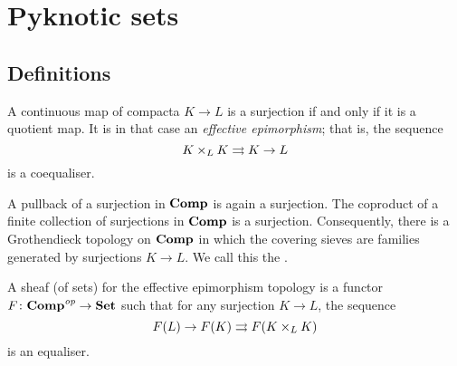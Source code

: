 
\section{Pyknotic sets}

\subsection{Definitions}

\begin{cnstr}
	A continuous map of compacta $ K \to L $ is a surjection if and only if
	it is a quotient map.
	It is in that case an \emph{effective epimorphism};
	that is, the sequence
	\[
		K \times_L K \rightrightarrows K \to L
	\]
	is a coequaliser.

	A pullback of a surjection in $ \textbf{\textup{Comp}} $ is again a surjection.
	The coproduct of a finite collection of surjections in $ \textbf{\textup{Comp}} $ is a surjection.
	Consequently, there is a Grothendieck topology on $ \textbf{\textup{Comp}} $ in which the covering sieves are families generated by surjections $ K \to L $.
	We call this the .
\end{cnstr}

\begin{nul}
	A sheaf (of sets) for the effective epimorphism topology is a functor $ F \colon \textbf{\textup{Comp}}^{\textit{op}} \to \textbf{\textup{Set}} $ such that for any surjection $ K \to L $, the sequence
	\[
		F(L) \to F(K) \rightrightarrows F(K \times_L K)
	\]
	is an equaliser.
\end{nul}

